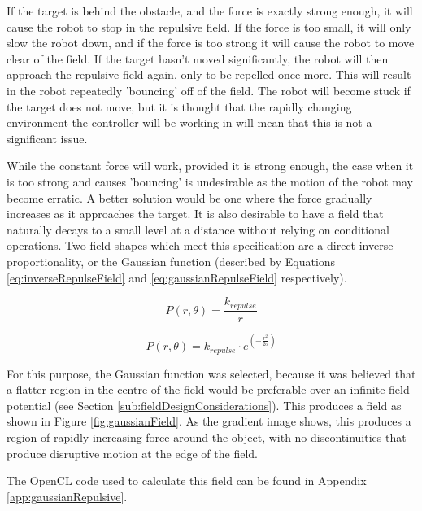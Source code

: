 \documentclass[10pt]{article}
\begin{document}
If the target is behind the obstacle, and the force is exactly strong enough, it
will cause the robot to stop in the repulsive field. If the force is too small,
it will only slow the robot down, and if the force is too strong it will cause
the robot to move clear of the field. If the target hasn't moved significantly,
the robot will then approach the repulsive field again, only to be repelled once
more. This will result in the robot repeatedly 'bouncing' off of the field. The
robot will become stuck if the target does not move, but it is thought that the
rapidly changing environment the controller will be working in will mean that
this is not a significant issue.

While the constant force will work, provided it is strong enough, the case when
it is too strong and causes 'bouncing' is undesirable as the motion of the robot
may become erratic. A better solution would be one where the force gradually
increases as it approaches the target. It is also desirable to have a field that
naturally decays to a small level at a distance without relying on conditional
operations. Two field shapes which meet this specification are a direct inverse
proportionality, or the Gaussian function (described by Equations
\ref{eq:inverseRepulseField} and \ref{eq:gaussianRepulseField} respectively).

\begin{equation}
P\left(r,\theta\right)=\frac{k_{repulse}}{r}\label{eq:inverseRepulseField}
\end{equation}

\begin{equation}
P\left(r,\theta\right)=k_{repulse}\cdot
e^{\left(-\frac{r^{2}}{2\sigma}\right)}\label{eq:gaussianRepulseField}
\end{equation}

For this purpose, the Gaussian function was selected, because it was believed
that a flatter region in the centre of the field would be preferable over an
infinite field potential (see Section \ref{sub:fieldDesignConsiderations}). This
produces a field as shown in Figure \ref{fig:gaussianField}. As the gradient
image shows, this produces a region of rapidly increasing force around the
object, with no discontinuities that produce disruptive motion at the edge of
the field.

The OpenCL code used to calculate this field can be found in Appendix
\ref{app:gaussianRepulsive}.
\end{document}
